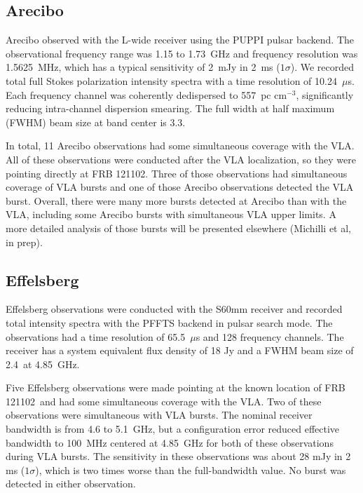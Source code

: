 \documentclass[twocolumn]{aastex61}
\newcommand{\frb}{FRB 121102}
\begin{document}
\subsection{Arecibo}

Arecibo observed with the L-wide receiver using the PUPPI pulsar backend. The observational frequency range was 1.15 to 1.73~GHz and frequency resolution was 1.5625~MHz, which has a typical sensitivity of 2~mJy in 2~ms ($1\sigma$). We recorded total full Stokes polarization intensity spectra with a time resolution of 10.24~$\mu$s. Each frequency channel was coherently dedispersed to 557~pc cm$^{-3}$, significantly reducing intra-channel dispersion smearing. The full width at half maximum (FWHM) beam size at band center is 3.3\arcmin.

In total, 11 Arecibo observations had some simultaneous coverage with the VLA. All of these observations were conducted after the VLA localization, so they were pointing directly at \frb. Three of those observations had simultaneous coverage of VLA bursts and one of those Arecibo observations detected the VLA burst. 
Overall, there were many more bursts detected at Arecibo than with the VLA, including some Arecibo bursts with simultaneous VLA upper limits. A more detailed analysis of those bursts will be presented elsewhere (Michilli et al, in prep).

\subsection{Effelsberg}

Effelsberg observations were conducted with the S60mm receiver and recorded total intensity spectra with the PFFTS backend in pulsar search mode. The observations had a time resolution of 65.5~$\mu$s and 128 frequency channels. The receiver has a system equivalent flux density of 18 Jy and a FWHM beam size of 2.4\arcmin\ at 4.85~GHz. 

Five Effelsberg observations were made pointing at the known location of \frb\ and had some simultaneous coverage with the VLA. Two of these observations were simultaneous with VLA bursts. The nominal receiver bandwidth is from 4.6 to 5.1~GHz, but a configuration error reduced effective bandwidth to 100~MHz centered at 4.85~GHz for both of these observations during VLA bursts. The sensitivity in these observations was about 28 mJy in 2 ms ($1\sigma$), which is two times worse than the full-bandwidth value. No burst was detected in either observation.
\end{document}
